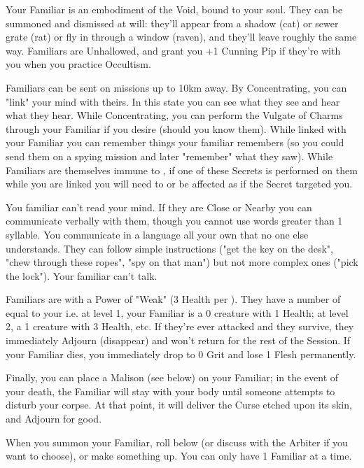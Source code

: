 Your Familiar is an embodiment of the Void, bound to your soul.  They can be summoned and dismissed at will: they'll appear from a shadow (cat) or sewer grate (rat) or fly in through a window (raven), and they'll leave roughly the same way.  Familiars are Unhallowed, and grant you +1 Cunning Pip if they're with you when you practice Occultism.

Familiars can be sent on missions up to 10km away. By Concentrating, you can "link" your mind with theirs. In this state you can see what they see and hear what they hear.  While Concentrating, you can perform the Vulgate of Charms through your Familiar if you desire (should you know them). While linked with your Familiar you can remember things your familiar remembers (so you could send them on a spying mission and later "remember" what they saw). While Familiars are themselves immune to , if one of these Secrets is performed on them while you are linked you will need to  or be affected as if the Secret targeted you. 

You familiar can't read your mind. If they are Close or Nearby you can communicate verbally with them, though you cannot use words greater than 1 syllable.  You communicate in a language all your own that no one else understands.  They can follow simple instructions ("get the key on the desk", "chew through these ropes", "spy on that man") but not more complex ones ("pick the lock").  Your familiar can't talk. 

Familiars are  with a Power of "Weak" (3 Health per \HD). They have a number of \HD equal to your  i.e. at level 1, your Familiar is a 0 \HD creature with 1 Health; at level 2, a 1 \HD creature with 3 Health, etc. If they're ever attacked and they survive, they immediately Adjourn (disappear) and won't return for the rest of the Session. If your Familiar dies, you immediately drop to 0 Grit and lose 1 Flesh permanently.


Finally, you can place a Malison (see below) on your Familiar; in the event of your death, the Familiar will stay with your body until someone attempts to disturb your corpse.  At that point, it will deliver the Curse etched upon its skin, and Adjourn for good.

When you summon your Familiar, roll below (or discuss with the Arbiter if you want to choose), or make something up.  You can only have 1 Familiar at a time.



